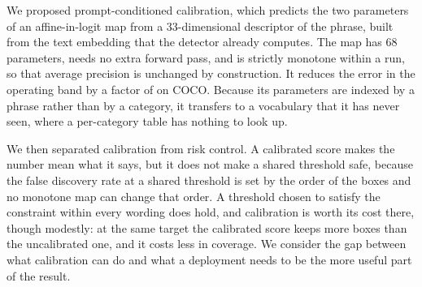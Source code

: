 We proposed prompt-conditioned calibration, which predicts the two parameters of an
affine-in-logit map from a 33-dimensional descriptor of the phrase, built from the text embedding
that the detector already computes. The map has 68 parameters, needs no extra forward pass, and is
strictly monotone within a run, so that average precision is unchanged by construction. It reduces
the error in the operating band by a factor of \FACTOR{} on COCO. Because its parameters are
indexed by a phrase rather than by a category, it transfers to a vocabulary that it has never seen,
where a per-category table has nothing to look up.

We then separated calibration from risk control. A calibrated score makes the number mean what it
says, but it does not make a shared threshold safe, because the false discovery rate at a shared
threshold is set by the order of the boxes and no monotone map can change that order. A threshold
chosen to satisfy the constraint within every wording does hold, and calibration is worth its cost
there, though modestly: at the same target the calibrated score keeps \WCGAIN{} more boxes than the
uncalibrated one, and it costs less in coverage. We consider the gap between what
calibration can do and what a deployment needs to be the more useful part of the result.
